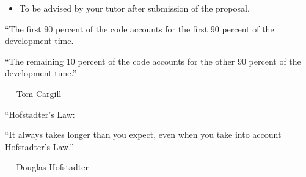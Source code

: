 \documentclass{../fal_assignment}
\begin{document}
\begin{itemize}
    \item To be advised by your tutor after submission of the proposal.
\end{itemize}

\begin{marginquote}
    ``The first 90 percent of the code accounts for the first 90 percent of the development time.
    
    ``The remaining 10 percent of the code accounts for the other 90 percent of the development time.''
    
    --- Tom Cargill
    
    \marginquoterule
    
    ``Hofstadter's Law:
    
    ``It always takes longer than you expect, even when you take into account Hofstadter's Law.''
    
    --- Douglas Hofstadter
\end{marginquote}
\end{document}
